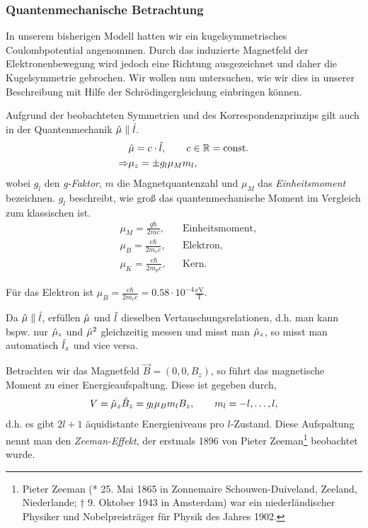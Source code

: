 \subsubsection{Quantenmechanische Betrachtung}

In unserem bisherigen Modell hatten wir ein kugelsymmetrisches
Coulombpotential angenommen. Durch das induzierte Magnetfeld der
Elektronenbewegung wird jedoch eine Richtung ausgezeichnet und daher die
Kugelsymmetrie gebrochen. Wir wollen nun untersuchen, wie wir dies in unserer
Beschreibung mit Hilfe der Schrödingergleichung einbringen können.

Aufgrund der beobachteten Symmetrien und des Korrespondenzprinzips gilt auch in
der Quantenmechanik $\hat{\boldmath{\mu}}\parallel\hat{\boldmath{l}}$.
\begin{align*}
&\hat{\boldmath{\mu}} = c\cdot\hat{\boldmath{l}},\qquad c \in\mathbb{R} = \mathrm{const}.\\
\Rightarrow & \mu_z = \pm g_l \mu_M m_l,
\end{align*}
wobei $g_l$ den \emph{g-Faktor}, $m$ die Magnetquantenzahl und $\mu_M$ das
\emph{Einheitsmoment} bezeichnen. $g_l$ beschreibt, wie groß das
quantenmechanische Moment im Vergleich zum klassischen ist.
\begin{align*}
&\mu_M = \frac{q\hbar}{2mc}, && \text{Einheitsmoment},\\
&\mu_B = \frac{e\hbar}{2m_ec}, && \text{Elektron},\\
&\mu_K = \frac{e\hbar}{2m_pc}, && \text{Kern}.
\end{align*}
\begin{bspn}
Für das Elektron ist $\mu_B = \frac{e\hbar}{2m_ec} = 0.58\cdot
10^{-4}\frac{\mathrm{eV}}{\mathrm{T}}$.\bsphere
\end{bspn}
Da $\hat{\boldmath{\mu}}\parallel\hat{\boldmath{l}}$, erfüllen $\hat{\boldmath{\mu}}$ und $\hat{\boldmath{l}}$ dieselben
Vertauschungsrelationen, d.h. man kann bspw. nur $\hat{\boldmath{\mu}}_z$ und $\hat{\boldmath{\mu}}^2$
gleichzeitig messen und misst man $\hat{\boldmath{\mu}}_z$, so misst man automatisch
$\hat{\boldmath{l}}_z$ und vice versa.

Betrachten wir das Magnetfeld $\vec{B}=(0,0,B_z)$, so führt das magnetische
Moment zu einer Energieaufspaltung. Diese ist gegeben durch,
\begin{align*}
V = \hat{\boldmath{\mu}}_z \hat{\boldmath{B}}_z = g_l \mu_B m_l B_z,\qquad m_l = -l,\ldots,l, 
\end{align*}
d.h. es gibt $2l+1$ äquidistante Energieniveaus pro $l$-Zustand. Diese
Aufspaltung nennt man den \emph{Zeeman-Effekt}, der erstmals 1896 von Pieter Zeeman\footnote{Pieter
Zeeman (* 25. Mai 1865 in Zonnemaire Schouwen-Duiveland, Zeeland, Niederlande;
† 9. Oktober 1943 in Amsterdam) war ein niederländischer Physiker und
Nobelpreisträger für Physik des Jahres 1902.} beobachtet wurde.

